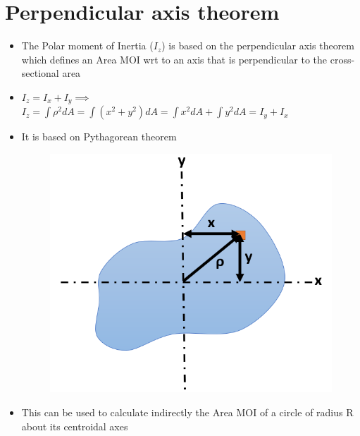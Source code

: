 \documentclass[8pt]{report}
\begin{document}
	\section{Perpendicular axis theorem}
		\begin{itemize}
			\item The Polar moment of Inertia ($I_z$) is based on the perpendicular axis theorem which defines an Area MOI wrt to an axis that is perpendicular to the cross-sectional area
			\item $\boxed{I_z = I_x + I_y}\implies$ $I_z = \int \rho^2dA = \int (x^2+y^2)dA = \int x^2dA + \int y^2dA = I_y + I_x$
			\item It is based on Pythagorean theorem
			\begin{figure}[H]
				\centering
				\includegraphics[scale=0.5]{perpendiculartheorem.png}
			\end{figure}
			\item This can be used to calculate indirectly the Area MOI of a circle of radius R about its centroidal axes
		\end{itemize}\hrulefill
\end{document}
